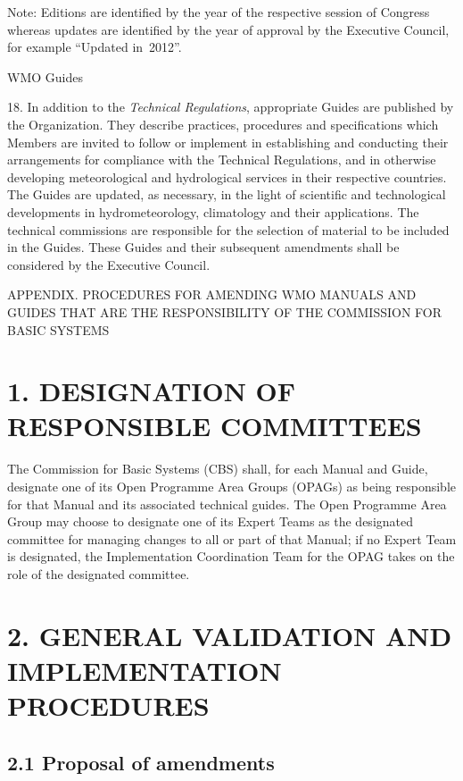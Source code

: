 Note: Editions are identified by the year of the respective session of Congress whereas updates are identified by the year of approval by the Executive Council, for example ``Updated in~2012''.

WMO Guides

18. In addition to the \emph{Technical Regulations}, appropriate Guides are published by the Organization. They describe practices, procedures and specifications which Members are invited to follow or implement in establishing and conducting their arrangements for compliance with the Technical Regulations, and in otherwise developing meteorological and hydrological services in their respective countries. The Guides are updated, as necessary, in the light of scientific and technological developments in hydrometeorology, climatology and their applications. The technical commissions are responsible for the selection of material to be included in the Guides. These Guides and their subsequent amendments shall be considered by the Executive Council.

APPENDIX. PROCEDURES FOR AMENDING WMO MANUALS AND GUIDES THAT ARE THE RESPONSIBILITY OF THE COMMISSION FOR BASIC SYSTEMS

\hypertarget{designation-of-responsible-committees}{%
\section{1. DESIGNATION OF RESPONSIBLE COMMITTEES}\label{designation-of-responsible-committees}}

The Commission for Basic Systems (CBS) shall, for each Manual and Guide, designate one of its Open Programme Area Groups (OPAGs) as being responsible for that Manual and its associated technical guides. The Open Programme Area Group may choose to designate one of its Expert Teams as the designated committee for managing changes to all or part of that Manual; if no Expert Team is designated, the Implementation Coordination Team for the OPAG takes on the role of the designated committee.

\hypertarget{general-validation-and-implementation-procedures}{%
\section{2. GENERAL VALIDATION AND IMPLEMENTATION PROCEDURES}\label{general-validation-and-implementation-procedures}}

\hypertarget{proposal-of-amendments}{%
\subsection{2.1 Proposal of amendments}\label{proposal-of-amendments}}

